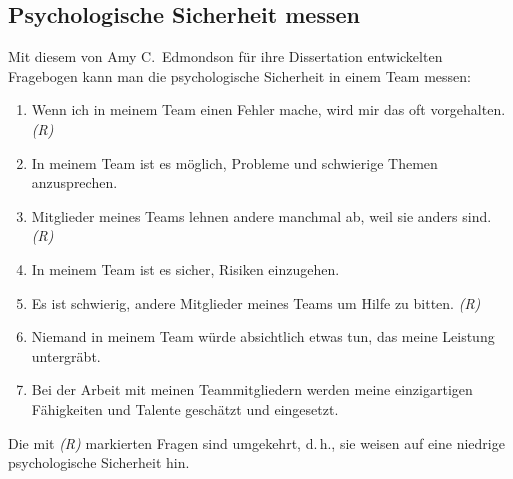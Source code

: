 \subsection{Psychologische Sicherheit messen}
\label{ps-messen}

Mit diesem von Amy C.~Edmondson für ihre Dissertation entwickelten Fragebogen kann man die psychologische Sicherheit in einem Team messen:

\begin{enumerate}
  \item Wenn ich in meinem Team einen Fehler mache, wird mir das oft vorgehalten. \emph{(R)}
  \item In meinem Team ist es möglich, Probleme und schwierige Themen anzusprechen.
  \item Mitglieder meines Teams lehnen andere manchmal ab, weil sie anders sind. \emph{(R)}
  \item In meinem Team ist es sicher, Risiken einzugehen.
  \item Es ist schwierig, andere Mitglieder meines Teams um Hilfe zu bitten. \emph{(R)}
  \item Niemand in meinem Team würde absichtlich etwas tun, das meine Leistung untergräbt.
  \item Bei der Arbeit mit meinen Teammitgliedern werden meine einzigartigen Fähigkeiten und Talente geschätzt und eingesetzt.
\end{enumerate}

Die mit \emph{(R)} markierten Fragen sind umgekehrt, d.\,h., sie weisen auf eine niedrige psychologische Sicherheit hin.
